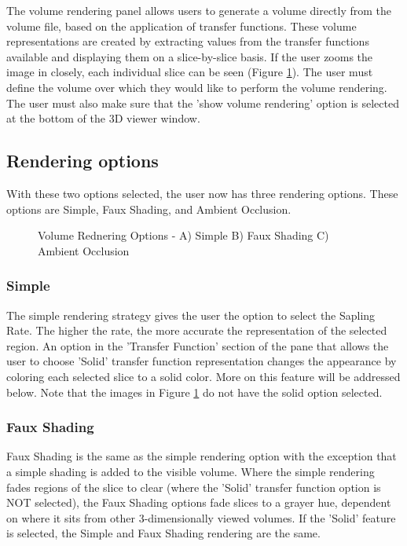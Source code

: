 \documentclass[fleqn,11pt,openany]{book}
\begin{document}
The volume rendering panel allows users to generate a volume directly from the volume file, based on the application of transfer functions.
These volume representations are created by extracting values from the transfer functions available and displaying them on a slice-by-slice basis.
If the user zooms the image in closely, each individual slice can be seen (Figure \ref{fig:VolRendOpt}).
The user must define the volume over which they would like to perform the volume rendering.
The user must also make sure that the 'show volume rendering' option is selected at the bottom of the 3D viewer window.

\subsection{Rendering options}

With these two options selected, the user now has three rendering options.
These options are Simple, Faux Shading, and Ambient Occlusion.

\begin{figure}[h!]
\caption{Volume Rednering Options - A) Simple B) Faux Shading C) Ambient Occlusion}\label{fig:VolRendOpt}
\end{figure}

\subsubsection{Simple}
The simple rendering strategy gives the user the option to select the Sapling Rate.
The higher the rate, the more accurate the representation of the selected region.
An option in the 'Transfer Function' section of the pane that allows the user to choose 'Solid' transfer function representation changes the appearance by coloring each selected slice to a solid color.
More on this feature will be addressed below.
Note that the images in Figure \ref{fig:VolRendOpt} do not have the solid option selected.

\subsubsection{Faux Shading}
Faux Shading is the same as the simple rendering option with the exception that a simple shading is added to the visible volume.
Where the simple rendering fades regions of the slice to clear (where the 'Solid' transfer function option is NOT selected), the Faux Shading options fade slices to a grayer hue, dependent on where it sits from other 3-dimensionally viewed volumes.
If the 'Solid' feature is selected, the Simple and Faux Shading rendering are the same.
\end{document}
